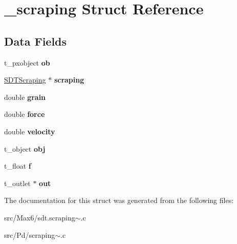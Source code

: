 \hypertarget{struct__scraping}{}\section{\+\_\+scraping Struct Reference}
\label{struct__scraping}
\subsection*{Data Fields}
\begin{DoxyCompactItemize}
\item 
\hypertarget{struct__scraping_a55b4380edb216f04a1c42b9095594963}{}t\+\_\+pxobject {\bfseries ob}\label{struct__scraping_a55b4380edb216f04a1c42b9095594963}

\item 
\hypertarget{struct__scraping_aa39772704584004eab1810b355083add}{}\hyperlink{struct_s_d_t_scraping}{S\+D\+T\+Scraping} $\ast$ {\bfseries scraping}\label{struct__scraping_aa39772704584004eab1810b355083add}

\item 
\hypertarget{struct__scraping_a70338fcaf3537644825b356846dc7de8}{}double {\bfseries grain}\label{struct__scraping_a70338fcaf3537644825b356846dc7de8}

\item 
\hypertarget{struct__scraping_aab6099c236e628500314462a9b259d66}{}double {\bfseries force}\label{struct__scraping_aab6099c236e628500314462a9b259d66}

\item 
\hypertarget{struct__scraping_accacf4e9263030d70ed79f8516c0eac5}{}double {\bfseries velocity}\label{struct__scraping_accacf4e9263030d70ed79f8516c0eac5}

\item 
\hypertarget{struct__scraping_a21775ab6bc98b0961a6e9fd9d832e65b}{}t\+\_\+object {\bfseries obj}\label{struct__scraping_a21775ab6bc98b0961a6e9fd9d832e65b}

\item 
\hypertarget{struct__scraping_a73198eb29c82f0df575e45396b68c18c}{}t\+\_\+float {\bfseries f}\label{struct__scraping_a73198eb29c82f0df575e45396b68c18c}

\item 
\hypertarget{struct__scraping_a07b901a5d7d4140b7f701a94bf7f245c}{}t\+\_\+outlet $\ast$ {\bfseries out}\label{struct__scraping_a07b901a5d7d4140b7f701a94bf7f245c}

\end{DoxyCompactItemize}


The documentation for this struct was generated from the following files\+:\begin{DoxyCompactItemize}
\item 
src/\+Max6/sdt.\+scraping$\sim$.\+c\item 
src/\+Pd/scraping$\sim$.\+c\end{DoxyCompactItemize}
